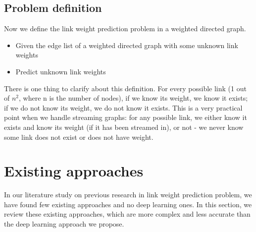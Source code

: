 \documentclass[conference]{IEEEtran}
\begin{document}
\subsection{Problem definition}
Now we define the link weight prediction problem in a weighted directed graph.
\begin{itemize}
	\item Given the edge list of a weighted directed graph with some unknown link weights
	\item Predict unknown link weights
\end{itemize}
There is one thing to clarify about this definition.
For every possible link (1 out of $ n^2 $, where n is the number of nodes), 
if we know its weight, we know it exists;
if we do not know its weight, we do not know it exists.
This is a very practical point when we handle streaming graphs:
for any possible link,
we either know it exists and know its weight (if it has been streamed in), or not - we never know some link does not exist or does not have weight.

\section{Existing approaches}
In our literature study on previous research in link weight prediction problem,
we have found few existing approaches and no deep learning ones.
In this section,
we review these existing approaches,
which are more complex and less accurate
than the deep learning approach we propose.
\end{document}
